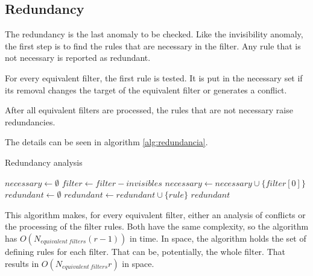 \subsection{Redundancy}


The redundancy is the last anomaly to be checked. Like the invisibility anomaly,
the first step is to find the rules that are necessary in the filter. Any rule
that is not necessary is reported as redundant.

For every equivalent filter, the first rule is tested. It is put in the
necessary set if its removal changes
the target of the equivalent filter or generates a conflict.

After all equivalent filters  are processed, the rules that are not necessary
raise redundancies.

The details can be seen in algorithm \ref{alg:redundancia}.

\begin{algorithm}
	\caption{\label{alg:redundancia}Redundancy analysis}
	\begin{algorithmic}[1]
			\State $necessary \gets \emptyset$
				\State $filter \gets filter - invisibles$
					\State $necessary \gets necessary \cup \{filter[0]\}$
				\EndIf
			\EndFor
			\State $redundant \gets \emptyset$
					\State $redundant \gets redundant \cup \{rule\}$
				\EndIf
			\EndFor
			\State \Return $redundant$
		\EndFunction
		\State
				\State \Return \True
			\EndIf
				\State \Return \True
			\EndIf
			\State \Return \False
		\EndFunction
	\end{algorithmic}
\end{algorithm}

This algorithm makes, for every equivalent filter, either an analysis of
conflicts or the processing of the filter rules. Both have the same complexity,
so the algorithm has $O(N_{equivalent\ filters} (r-1))$ in time. In space, the
algorithm holds the set of defining rules for each filter. That can be,
potentially, the whole filter. That results in $O(N_{equivalent\ filters} r)$ in
space.



